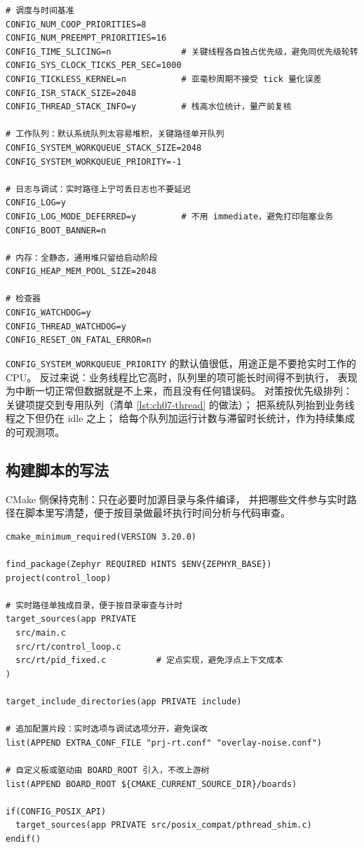 \documentclass[12pt,a4paper,fontset=fandol]{ctexbook}
\newcommand{\Tp}[1]{\texttt{#1}}
\newcommand{\Lang}[1]{\textsf{#1}}
\begin{document}
\begin{lstlisting}[style=yamlstyle,caption={YAML：prj.conf 中与实时相关的关键项},label={lst:ch07-prjconf}]
# 调度与时间基准
CONFIG_NUM_COOP_PRIORITIES=8
CONFIG_NUM_PREEMPT_PRIORITIES=16
CONFIG_TIME_SLICING=n              # 关键线程各自独占优先级，避免同优先级轮转
CONFIG_SYS_CLOCK_TICKS_PER_SEC=1000
CONFIG_TICKLESS_KERNEL=n           # 亚毫秒周期不接受 tick 量化误差
CONFIG_ISR_STACK_SIZE=2048
CONFIG_THREAD_STACK_INFO=y         # 栈高水位统计，量产前复核

# 工作队列：默认系统队列太容易堆积，关键路径单开队列
CONFIG_SYSTEM_WORKQUEUE_STACK_SIZE=2048
CONFIG_SYSTEM_WORKQUEUE_PRIORITY=-1

# 日志与调试：实时路径上宁可丢日志也不要延迟
CONFIG_LOG=y
CONFIG_LOG_MODE_DEFERRED=y         # 不用 immediate，避免打印阻塞业务
CONFIG_BOOT_BANNER=n

# 内存：全静态，通用堆只留给启动阶段
CONFIG_HEAP_MEM_POOL_SIZE=2048

# 检查器
CONFIG_WATCHDOG=y
CONFIG_THREAD_WATCHDOG=y
CONFIG_RESET_ON_FATAL_ERROR=n
\end{lstlisting}

\begin{warning}[title={默认系统工作队列是延迟链上最容易被忽略的一环}]
\Tp{CONFIG\_SYSTEM\_WORKQUEUE\_PRIORITY} 的默认值很低，用途正是不要抢实时工作的 CPU。
反过来说：业务线程比它高时，队列里的项可能长时间得不到执行，
表现为中断一切正常但数据就是不上来，而且没有任何错误码。
对策按优先级排列：关键项提交到专用队列（清单 \ref{lst:ch07-thread} 的做法）；
把系统队列抬到业务线程之下但仍在 idle 之上；
给每个队列加运行计数与滞留时长统计，作为持续集成的可观测项。
\end{warning}

\subsection{构建脚本的写法}

\Lang{CMake} 侧保持克制：只在必要时加源目录与条件编译，
并把哪些文件参与实时路径在脚本里写清楚，便于按目录做最坏执行时间分析与代码审查。

\begin{lstlisting}[style=cmakestyle,caption={CMake：应用构建脚本片段},label={lst:ch07-cmake}]
cmake_minimum_required(VERSION 3.20.0)

find_package(Zephyr REQUIRED HINTS $ENV{ZEPHYR_BASE})
project(control_loop)

# 实时路径单独成目录，便于按目录审查与计时
target_sources(app PRIVATE
  src/main.c
  src/rt/control_loop.c
  src/rt/pid_fixed.c          # 定点实现，避免浮点上下文成本
)

target_include_directories(app PRIVATE include)

# 追加配置片段：实时选项与调试选项分开，避免误改
list(APPEND EXTRA_CONF_FILE "prj-rt.conf" "overlay-noise.conf")

# 自定义板或驱动由 BOARD_ROOT 引入，不改上游树
list(APPEND BOARD_ROOT ${CMAKE_CURRENT_SOURCE_DIR}/boards)

if(CONFIG_POSIX_API)
  target_sources(app PRIVATE src/posix_compat/pthread_shim.c)
endif()
\end{lstlisting}
\end{document}
